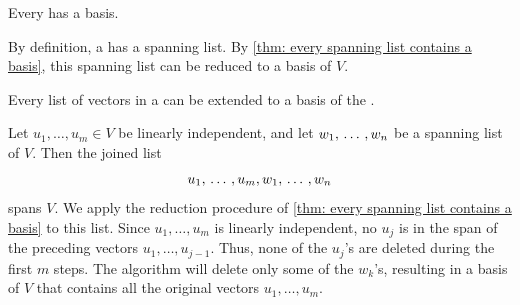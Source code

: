 \setcounter{thm}{30}
\begin{thm} 
  \label{thm: every finite-dimensional vector space has a basis}
  Every \findimvs has a basis.
\end{thm}
\begin{prf}
  By definition, a \fdvs has a spanning list. By \ref{thm: every spanning list contains a basis}, this spanning list can be reduced to a basis of $V$.
\end{prf}

\begin{thm}
  \label{thm: every linearly independent list of vectors in a finite-dimensional vector space can be extended to a basis of the vector space}
  Every \lid list of vectors in a \findimvs can be extended to a basis of the \vs.
\end{thm}
\begin{prf}
  Let $u_1, \ldots, u_m \in V$ be linearly independent, and let $w_1, {\, \ldots \,\,}, w_n$ be a spanning list of $V$. Then the joined list
  \begin{equation}
    u_1, {\, \ldots \,\,} , u_m, w_1, {\, \ldots \,\,} , w_n
  \end{equation}
  spans $V$. We apply the reduction procedure of \ref{thm: every spanning list contains a basis} to this list.
  Since $u_1, \dots, u_m$ is linearly independent, no $u_j$ is in the span of the preceding vectors $u_1, \dots, u_{j-1}$. Thus, none of the $u_j$'s are deleted during the first $m$ steps.
  The algorithm will delete only some of the $w_k$'s, resulting in a basis of $V$ that contains all the original vectors $u_1, \dots, u_m$.
\end{prf}

